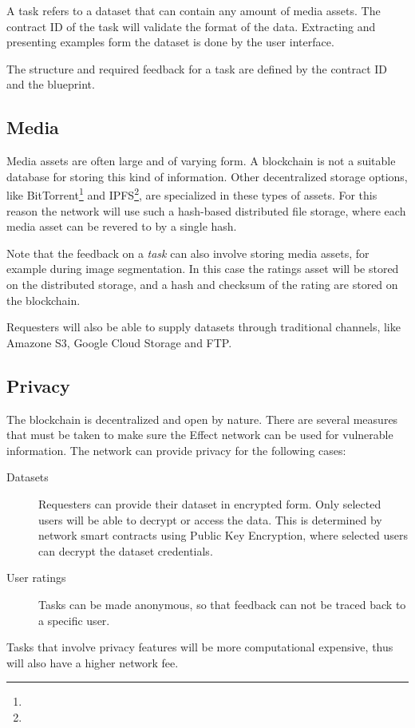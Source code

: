 \documentclass{article}
\begin{document}
A task refers to a dataset that can contain any amount of media
assets. The contract ID of the task will validate the format of the
data. Extracting and presenting examples form the dataset is done by
the user interface.

The structure and required feedback for a task are defined by the
contract ID and the blueprint.

\subsection{Media}
Media assets are often large and of varying form. A blockchain is not
a suitable database for storing this kind of information. Other
decentralized storage options, like BitTorrent\footnote{} and
IPFS\footnote{}, are specialized in these types of assets. For this
reason the network will use such a hash-based distributed file
storage, where each media asset can be revered to by a single hash.

Note that the feedback on a \emph{task} can also involve storing media
assets, for example during image segmentation. In this case the
ratings asset will be stored on the distributed storage, and a hash
and checksum of the rating are stored on the blockchain.

Requesters will also be able to supply datasets through traditional
channels, like Amazone S3, Google Cloud Storage and FTP.

\subsection{Privacy}
The blockchain is decentralized and open by nature. There are several
measures that must be taken to make sure the Effect network can be
used for vulnerable information. The network can provide privacy for
the following cases:

\begin{description}
\item[Datasets] Requesters can provide their dataset in encrypted
  form. Only selected users will be able to decrypt or access the
  data. This is determined by network smart contracts using Public Key
  Encryption, where selected users can decrypt the dataset
  credentials.
\item[User ratings] Tasks can be made anonymous, so that feedback can
  not be traced back to a specific user.
\end{description}

Tasks that involve privacy features will be more computational
expensive, thus will also have a higher network fee.
\end{document}
